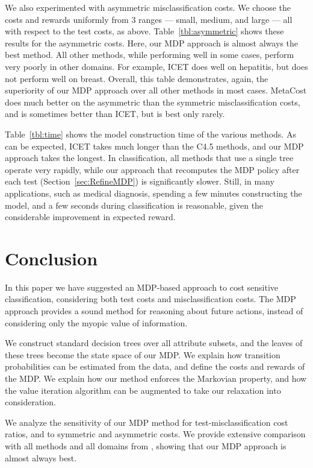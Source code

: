 \documentclass[letterpaper]{article}
\theoremstyle{definition}
\begin{document}
We also experimented with asymmetric misclassification costs. We choose the costs and rewards uniformly from 3 ranges --- small, medium, and large --- all with respect to the test costs, as above. Table~\ref{tbl:asymmetric} shows these results for the asymmetric costs. Here, our MDP approach is almost always the best method. All other methods, while performing well in some cases, perform very poorly in other domains. For example, ICET does well on hepatitis, but does not perform well on breast. Overall, this table demonstrates, again, the superiority of our MDP approach over all other methods in most cases. MetaCost does much better on the asymmetric than the symmetric misclassification costs, and is sometimes better than ICET, but is best only rarely.

Table~\ref{tbl:time} shows the model construction time of the various methods. As can be expected, ICET takes much longer than the C4.5 methods, and our MDP approach takes the longest. In classification, all methods that use a single tree operate very rapidly, while our approach that recomputes the MDP policy after each test (Section~\ref{sec:RefineMDP}) is significantly slower. Still, in many applications, such as medical diagnosis, spending a few minutes constructing the model, and a few seconds during classification is reasonable, given the considerable improvement in expected reward.



\section{Conclusion}

In this paper we have suggested an MDP-based approach to cost sensitive classification, considering both test costs and misclassification costs. The MDP approach provides a sound method for reasoning about future actions, instead of considering only the myopic value of information. 

We construct standard decision trees over all attribute subsets, and the leaves of these trees become the state space of our MDP. We explain how transition probabilities can be estimated from the data, and define the costs and rewards of the MDP. We explain how our method enforces the Markovian property, and how the value iteration algorithm can be augmented to take our relaxation into consideration.

We analyze the sensitivity of our MDP method for test-misclassification cost ratios, and to symmetric and asymmetric costs. We provide extensive comparison with all methods and all domains from \cite{LomaxV11}, showing that our MDP approach is almost always best. 
\end{document}

